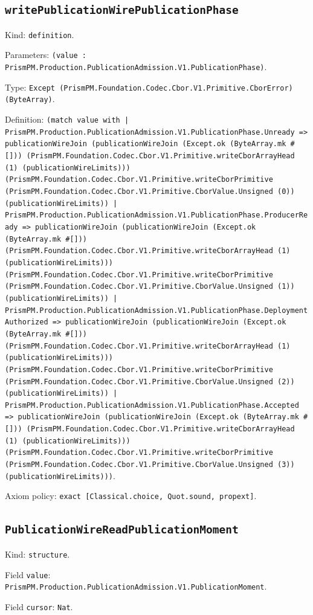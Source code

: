 \documentclass[11pt]{article}
\begin{document}
\subsection*{\texttt{writePublicationWirePublicationPhase}}
\noindent Kind: \texttt{definition}.\par
\noindent Parameters: \texttt{(value : PrismPM.Production.PublicationAdmission.V1.PublicationPhase)}.\par
\noindent Type: \texttt{Except (PrismPM.Foundation.Codec.Cbor.V1.Primitive.CborError) (ByteArray)}.\par
\noindent Definition: \texttt{(match value with | PrismPM.Production.PublicationAdmission.V1.PublicationPhase.Unready => publicationWireJoin (publicationWireJoin (Except.ok (ByteArray.mk \#[])) (PrismPM.Foundation.Codec.Cbor.V1.Primitive.writeCborArrayHead (1) (publicationWireLimits))) (PrismPM.Foundation.Codec.Cbor.V1.Primitive.writeCborPrimitive (PrismPM.Foundation.Codec.Cbor.V1.Primitive.CborValue.Unsigned (0)) (publicationWireLimits)) | PrismPM.Production.PublicationAdmission.V1.PublicationPhase.ProducerReady => publicationWireJoin (publicationWireJoin (Except.ok (ByteArray.mk \#[])) (PrismPM.Foundation.Codec.Cbor.V1.Primitive.writeCborArrayHead (1) (publicationWireLimits))) (PrismPM.Foundation.Codec.Cbor.V1.Primitive.writeCborPrimitive (PrismPM.Foundation.Codec.Cbor.V1.Primitive.CborValue.Unsigned (1)) (publicationWireLimits)) | PrismPM.Production.PublicationAdmission.V1.PublicationPhase.DeploymentAuthorized => publicationWireJoin (publicationWireJoin (Except.ok (ByteArray.mk \#[])) (PrismPM.Foundation.Codec.Cbor.V1.Primitive.writeCborArrayHead (1) (publicationWireLimits))) (PrismPM.Foundation.Codec.Cbor.V1.Primitive.writeCborPrimitive (PrismPM.Foundation.Codec.Cbor.V1.Primitive.CborValue.Unsigned (2)) (publicationWireLimits)) | PrismPM.Production.PublicationAdmission.V1.PublicationPhase.Accepted => publicationWireJoin (publicationWireJoin (Except.ok (ByteArray.mk \#[])) (PrismPM.Foundation.Codec.Cbor.V1.Primitive.writeCborArrayHead (1) (publicationWireLimits))) (PrismPM.Foundation.Codec.Cbor.V1.Primitive.writeCborPrimitive (PrismPM.Foundation.Codec.Cbor.V1.Primitive.CborValue.Unsigned (3)) (publicationWireLimits)))}.\par
\noindent Axiom policy: \texttt{exact [Classical.choice, Quot.sound, propext]}.\par
\subsection*{\texttt{PublicationWireReadPublicationMoment}}
\noindent Kind: \texttt{structure}.\par
\noindent Field \texttt{value}: \texttt{PrismPM.Production.PublicationAdmission.V1.PublicationMoment}.\par
\noindent Field \texttt{cursor}: \texttt{Nat}.\par
\end{document}
